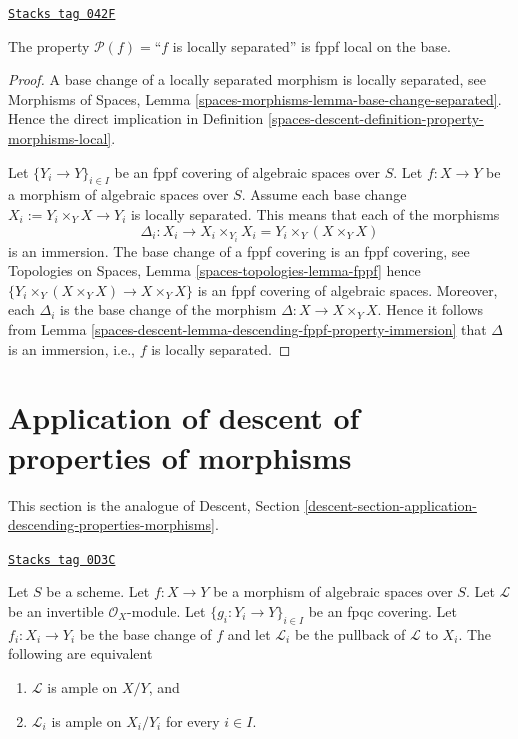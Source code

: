 \begin{lemma}
\label{spaces-descent-lemma-descending-fppf-property-locally-separated}
\href{https://stacks.math.columbia.edu/tag/042F}{\texttt{Stacks tag 042F}}

The property $\mathcal{P}(f) =$``$f$ is locally separated''
is fppf local on the base.
\end{lemma}

\begin{proof}
A base change of a locally separated morphism is locally separated, see
Morphisms of Spaces,
Lemma \ref{spaces-morphisms-lemma-base-change-separated}.
Hence the direct implication in
Definition \ref{spaces-descent-definition-property-morphisms-local}.

\medskip\noindent
Let $\{Y_i \to Y\}_{i \in I}$ be an fppf covering of algebraic spaces over $S$.
Let $f : X \to Y$ be a morphism of algebraic spaces over $S$.
Assume each base change $X_i := Y_i \times_Y X \to Y_i$ is locally separated.
This means that each of the morphisms
$$
\Delta_i :
X_i
\longrightarrow
X_i \times_{Y_i} X_i = Y_i \times_Y (X \times_Y X)
$$
is an immersion. The base change of a fppf covering is an
fppf covering, see
Topologies on Spaces, Lemma \ref{spaces-topologies-lemma-fppf}
hence $\{Y_i \times_Y (X \times_Y X) \to X \times_Y X\}$
is an fppf covering of algebraic spaces. Moreover, each
$\Delta_i$ is the base change of the morphism
$\Delta : X \to X \times_Y X$. Hence it follows from
Lemma \ref{spaces-descent-lemma-descending-fppf-property-immersion}
that $\Delta$ is an immersion, i.e., $f$ is locally separated.
\end{proof}

\section{Application of descent of properties of morphisms}
\label{spaces-descent-section-application-descending-properties-morphisms}
This section is the analogue of Descent, Section
\ref{descent-section-application-descending-properties-morphisms}.

\begin{lemma}
\label{spaces-descent-lemma-descending-property-ample}
\href{https://stacks.math.columbia.edu/tag/0D3C}{\texttt{Stacks tag 0D3C}}

Let $S$ be a scheme.
Let $f : X \to Y$ be a morphism of algebraic spaces over $S$.
Let $\mathcal{L}$ be an invertible $\mathcal{O}_X$-module.
Let $\{g_i : Y_i \to Y\}_{i \in I}$ be an fpqc covering.
Let $f_i : X_i \to Y_i$ be the base change of $f$ and let $\mathcal{L}_i$
be the pullback of $\mathcal{L}$ to $X_i$.
The following are equivalent
\begin{enumerate}
\item $\mathcal{L}$ is ample on $X/Y$, and
\item $\mathcal{L}_i$ is ample on $X_i/Y_i$
for every $i \in I$.
\end{enumerate}
\end{lemma}

